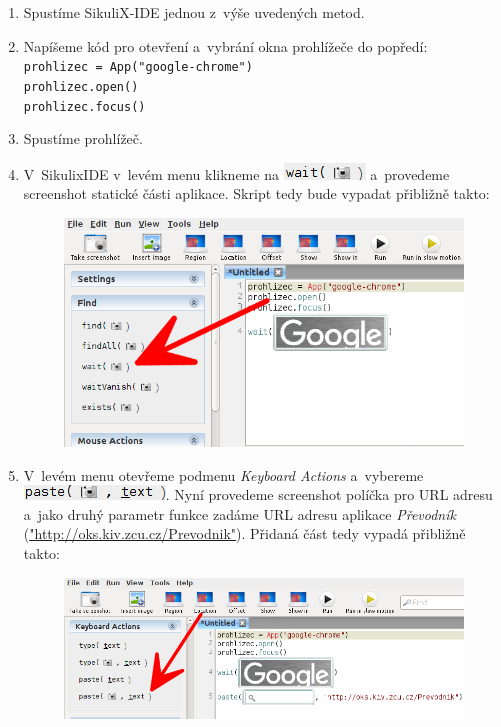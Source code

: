 			\begin{enumerate}
				\item Spustíme SikuliX-IDE jednou z~výše uvedených metod.
				\item Napíšeme kód pro otevření a~vybrání okna prohlížeče do popředí:\\\texttt{prohlizec = App("google-chrome")\\prohlizec.open()\\prohlizec.focus()}
				\item Spustíme prohlížeč.
				\item V~SikulixIDE v~levém menu klikneme na \includegraphics[scale=0.7]{img/PrvniSkript/wait.png} a~provedeme screenshot statické části aplikace. Skript tedy bude vypadat přibližně takto:
					\begin{figure}[ht!]
						\centering
						\includegraphics[width=12.5cm]{img/PrvniSkript/krok4.png}
					\end{figure}
					\FloatBarrier
				\item V~levém menu otevřeme podmenu \emph{Keyboard Actions} a~vybereme\\\includegraphics[scale=0.7]{img/PrvniSkript/paste.png}. Nyní provedeme screenshot políčka pro URL adresu a~jako druhý parametr funkce zadáme URL adresu aplikace \emph{Převodník} (\url{"http://oks.kiv.zcu.cz/Prevodnik"}). Přidaná část tedy vypadá přibližně takto:
					\begin{figure}[ht!]
						\centering
						\includegraphics[width=12.5cm]{img/PrvniSkript/krok5.png}

\end{figure}
\end{enumerate}

